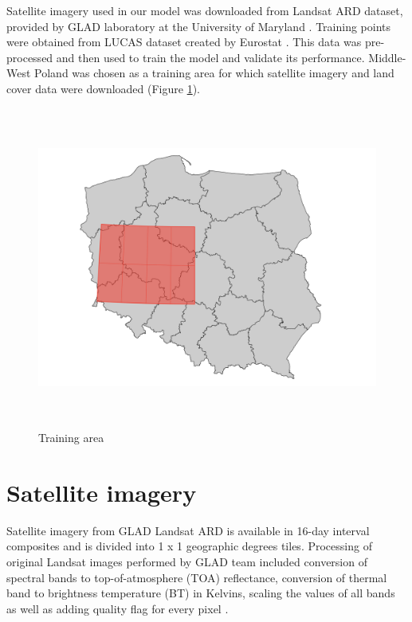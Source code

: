 \documentclass{amuthesis}
\begin{document}
Satellite imagery used in our model was downloaded from Landsat ARD
dataset, provided by GLAD laboratory at the University of Maryland
\autocite{potapov2020}. Training points were obtained from LUCAS dataset
created by Eurostat \autocite{dandrimont2020}. This data was
pre-processed and then used to train the model and validate its
performance. Middle-West Poland was chosen as a training area for which
satellite imagery and land cover data were downloaded (Figure
\ref{fig-rycina1}).

\begin{figure}[t]

{\centering \includegraphics[width=1\textwidth,height=4.16667in]{./figures/study_area.png}

}

\caption{\label{fig-rycina1}Training area}

\end{figure}

\hypertarget{sec-sat}{%
\section{Satellite imagery}\label{sec-sat}}

Satellite imagery from GLAD Landsat ARD is available in 16-day interval
composites and is divided into 1 x 1 geographic degrees tiles.
Processing of original Landsat images performed by GLAD team included
conversion of spectral bands to top-of-atmosphere (TOA) reflectance,
conversion of thermal band to brightness temperature (BT) in Kelvins,
scaling the values of all bands as well as adding quality flag for every
pixel \autocite{potapov2020}.
\end{document}
